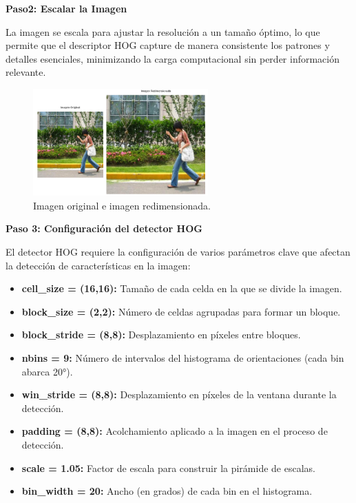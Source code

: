 \documentclass[a4paper]{article}
\begin{document}
\textbf{Paso2: Escalar la Imagen}
\par\vspace{0.5cm}

La imagen se escala para ajustar la resolución a un tamaño óptimo, lo que permite que el descriptor HOG capture de manera consistente los patrones y detalles esenciales, minimizando la carga computacional sin perder información relevante.

\begin{figure}[H]
    \centering
    \includegraphics[width=0.6\textwidth]{images/hog_paso_2.png}
    \caption{Imagen original e imagen redimensionada.}
\end{figure}

\textbf{Paso 3: Configuración del detector HOG}
\par\vspace{0.5cm}

El detector HOG requiere la configuración de varios parámetros clave que afectan la detección de características en la imagen:
\begin{itemize}
    \item \textbf{cell\_size = (16,16):} Tamaño de cada celda en la que se divide la imagen.
    \item \textbf{block\_size = (2,2):} Número de celdas agrupadas para formar un bloque.
    \item \textbf{block\_stride = (8,8):} Desplazamiento en píxeles entre bloques.
    \item \textbf{nbins = 9:} Número de intervalos del histograma de orientaciones (cada bin abarca 20°).
    \item \textbf{win\_stride = (8,8):} Desplazamiento en píxeles de la ventana durante la detección.
    \item \textbf{padding = (8,8):} Acolchamiento aplicado a la imagen en el proceso de detección.
    \item \textbf{scale = 1.05:} Factor de escala para construir la pirámide de escalas.
    \item \textbf{bin\_width = 20:} Ancho (en grados) de cada bin en el histograma.
\end{itemize}
\end{document}
